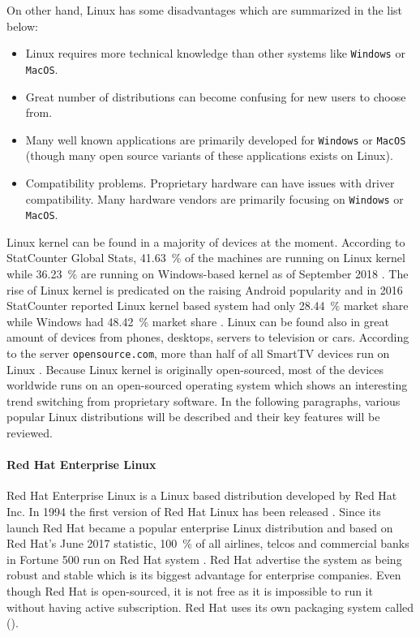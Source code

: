 On other hand, Linux has some disadvantages which are summarized in the list below:
\begin{itemize}
	\item Linux requires more technical knowledge than other systems like \texttt{Windows} or \texttt{MacOS}.
	\item Great number of distributions can become confusing for new users to choose from. 
	\item Many well known applications are primarily developed for \texttt{Windows} or \texttt{MacOS} (though many open source variants of these applications exists on Linux).
	\item Compatibility problems. Proprietary hardware can have issues with driver compatibility. Many hardware vendors are primarily focusing on \texttt{Windows} or \texttt{MacOS}.
\end{itemize}
Linux kernel can be found in a majority of devices at the moment. According to StatCounter Global Stats, \SI{41.63}{\percent} of the machines are running on Linux kernel while \SI{36.23}{\percent} are running on Windows-based kernel as of September 2018 \cite{StatCounter}. The rise of Linux kernel is predicated on the raising Android popularity and in 2016 StatCounter reported Linux kernel based system had only \SI{28.44}{\percent} market share while Windows had \SI{48.42}{\percent} market share \cite{StatCounter}. Linux can be found also in great amount of devices from phones, desktops, servers to television or cars. According to the server \texttt{opensource.com}, more than half of all SmartTV devices run on Linux \cite{opensourcecom}. Because Linux kernel is originally open-sourced, most of the devices worldwide runs on an open-sourced operating system which shows an interesting trend switching from proprietary software. In the following paragraphs, various popular Linux distributions will be described and their key features will be reviewed. 
\paragraph{Red Hat Enterprise Linux}
Red Hat Enterprise Linux is a Linux based distribution developed by Red Hat Inc. In 1994 the first version of Red Hat Linux has been released \cite{rhhistory}. Since its launch Red Hat became a popular enterprise Linux distribution and based on Red Hat's June 2017 statistic, \SI{100}{\percent} of all airlines, telcos and commercial banks in Fortune 500 run on Red Hat system \cite{rhtrusted}. Red Hat advertise the system as being robust and stable which is its biggest advantage for enterprise companies. Even though Red Hat is open-sourced, it is not free as it is impossible to run it without having active subscription. Red Hat uses its own packaging system called  ().
